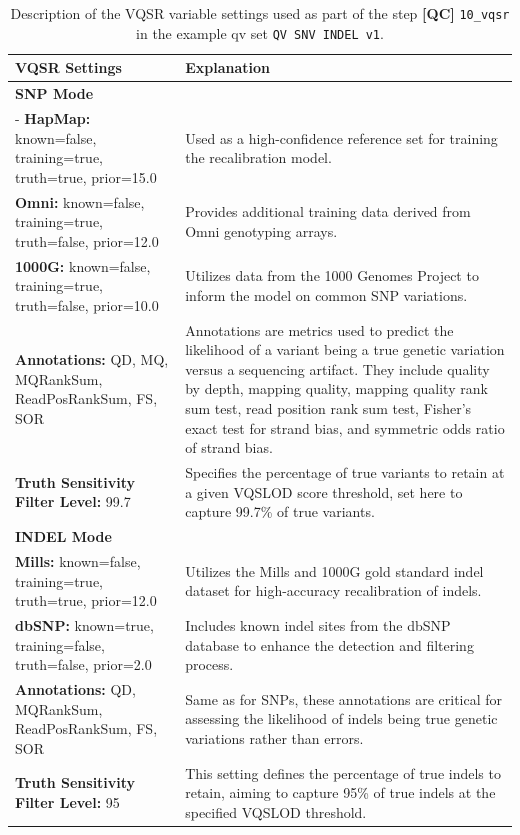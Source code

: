 \begin{table}[htbp]
\caption{Description of the VQSR variable settings used as part of the step \textbf{[QC]} \colorbox{kispiblue!30}{\texttt{10\_vqsr}} in the example \ac{qv} set \colorbox{colorSUNSET2!60}{\texttt{QV SNV INDEL v1}}.}
	\label{tab:variables_example}
\begin{tabular}{|p{5cm}|p{10cm}|}
    \hline
    \textbf{VQSR Settings} & \textbf{Explanation} \\
    \hline
    \textbf{SNP Mode} & \\
    - \textbf{HapMap:} known=false, training=true, truth=true, prior=15.0 & Used as a high-confidence reference set for training the recalibration model. \\
    \textbf{Omni:} known=false, training=true, truth=false, prior=12.0 & Provides additional training data derived from Omni genotyping arrays. \\
    \textbf{1000G:} known=false, training=true, truth=false, prior=10.0 & Utilizes data from the 1000 Genomes Project to inform the model on common SNP variations. \\
    \textbf{Annotations:} QD, MQ, MQRankSum, ReadPosRankSum, FS, SOR & Annotations are metrics used to predict the likelihood of a variant being a true genetic variation versus a sequencing artifact. They include quality by depth, mapping quality, mapping quality rank sum test, read position rank sum test, Fisher's exact test for strand bias, and symmetric odds ratio of strand bias. \\
    \textbf{Truth Sensitivity Filter Level:} 99.7 & Specifies the percentage of true variants to retain at a given VQSLOD score threshold, set here to capture 99.7\% of true variants. \\
    \hline
    \textbf{INDEL Mode} & \\
    \textbf{Mills:} known=false, training=true, truth=true, prior=12.0 & Utilizes the Mills and 1000G gold standard indel dataset for high-accuracy recalibration of indels. \\
    \textbf{dbSNP:} known=true, training=false, truth=false, prior=2.0 & Includes known indel sites from the dbSNP database to enhance the detection and filtering process. \\
    \textbf{Annotations:} QD, MQRankSum, ReadPosRankSum, FS, SOR & Same as for SNPs, these annotations are critical for assessing the likelihood of indels being true genetic variations rather than errors. \\
    \textbf{Truth Sensitivity Filter Level:} 95 & This setting defines the percentage of true indels to retain, aiming to capture 95\% of true indels at the specified VQSLOD threshold. \\
    \hline
\end{tabular}
\end{table}

